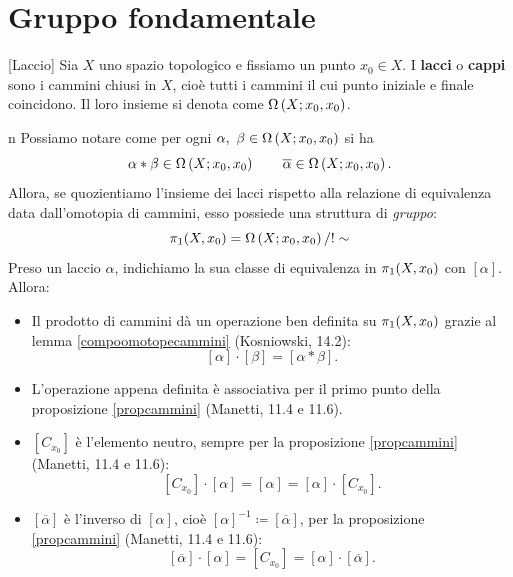 \section{Gruppo fondamentale}
\begin{definition}{}[Laccio]
	Sia $X$ uno spazio topologico e fissiamo un punto $x_0\in X$. I \textbf{lacci} o \textbf{cappi} sono i cammini chiusi in $X$, cioè tutti i cammini il cui punto iniziale e finale coincidono. Il loro insieme si denota come $\Omega\left(X; x_0,x_0\right)$.
\end{definition}
\begin{remark}{n}
	Possiamo notare come per ogni $\alpha,\ \beta\in\Omega\left(X; x_0,x_0\right)$ si ha
	\begin{equation*}
		\alpha\ast\beta\in\Omega\left(X; x_0,x_0\right)\qquad \overline{\alpha}\in\Omega\left(X; x_0,x_0\right).
	\end{equation*}
Allora, se quozientiamo l'insieme dei lacci rispetto alla relazione di equivalenza data dall'omotopia di cammini, esso possiede una struttura di \textit{gruppo}:
\begin{equation*}
	\homotopy[1]{X,x_0}=\pathset{X}{x_0,x_0}/!\sim
\end{equation*}
Preso un laccio $\alpha$, indichiamo la sua classe di equivalenza in $\homotopy[1]{X,x_0}$ con $\left[\alpha\right]$. Allora:
\begin{itemize}
	\item Il prodotto di cammini dà un operazione ben definita su $\homotopy[1]{X,x_0}$ grazie al lemma \ref{compoomotopecammini} (Kosniowski, 14.2):
	\begin{equation*}
		\left[\alpha\right]\cdot\left[\beta\right]=\left[\alpha\ast\beta\right].
	\end{equation*}
\item L'operazione appena definita è associativa per il primo punto della proposizione \ref{propcammini} (Manetti, 11.4 e 11.6).
\item $\left[C_{x_0}\right]$ è l'elemento neutro, sempre per la proposizione \ref{propcammini} (Manetti, 11.4 e 11.6):
\begin{equation*}
	\left[C_{x_0}\right]\cdot\left[\alpha\right]=\left[\alpha\right]=\left[\alpha\right]\cdot\left[C_{x_0}\right].
\end{equation*}
\item $\left[\overline{\alpha}\right]$ è l'inverso di $\left[\alpha\right]$, cioè $\left[\alpha\right]^{-1}\coloneqq\left[\overline{\alpha}\right]$, per la proposizione \ref{propcammini} (Manetti, 11.4 e 11.6):
\begin{equation*}
\left[\overline{\alpha}\right]\cdot\left[\alpha\right]=\left[C_{x_0}\right]=\left[\alpha\right]\cdot\left[\overline{\alpha}\right].
\end{equation*}
\end{itemize}
\end{remark}
